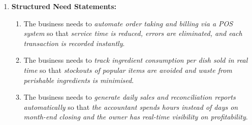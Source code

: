 \documentclass[11pt]{article}
\begin{document}
\begin{exoresolu}
\begin{enumerate}
\begin{itemize}
        \item (a) Reduce billing time $\to$ \textbf{E}fficiency (workflow automation) and \textbf{S}ervice (customer wait time).
        \item (b) Know profitable dishes $\to$ \textbf{I}nformation (accurate, timely reporting) and \textbf{E}conomy (cost control).
        \item (c) Prevent free meals $\to$ \textbf{C}ontrol (security, audit trail, fraud prevention).
        \item (d) QR code ordering $\to$ \textbf{S}ervice (customer experience) and \textbf{E}fficiency (reduces waiter trips).
    \end{itemize}
    \item \textbf{Structured Need Statements:}
    \begin{enumerate}
        \item The business needs to \emph{automate order taking and billing via a POS system} so that \emph{service time is reduced, errors are eliminated, and each transaction is recorded instantly}.
        \item The business needs to \emph{track ingredient consumption per dish sold in real time} so that \emph{stockouts of popular items are avoided and waste from perishable ingredients is minimised}.
        \item The business needs to \emph{generate daily sales and reconciliation reports automatically} so that \emph{the accountant spends hours instead of days on month-end closing and the owner has real-time visibility on profitability}.
    \end{enumerate}
\end{enumerate}
\end{exoresolu}
\end{document}
